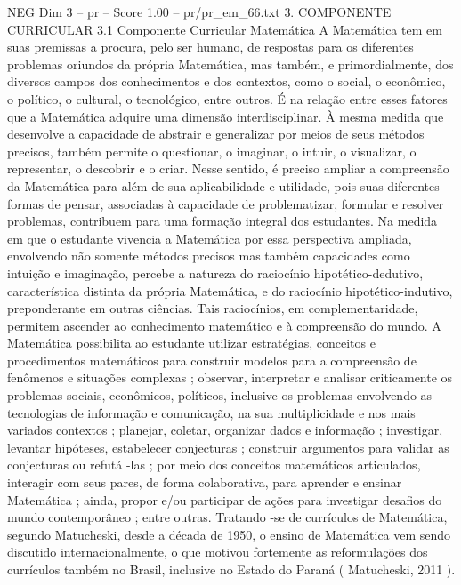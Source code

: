 \begin{textsample}{NEG Dim 3 – pr – Score 1.00 – pr/pr\_em\_66.txt}  \label{ex:f3_neg_140}
3.
COMPONENTE CURRICULAR 3.1 Componente Curricular Matemática A Matemática tem em suas premissas a procura, pelo ser humano, de respostas para os diferentes problemas oriundos da própria Matemática, mas também, e primordialmente, dos diversos campos dos conhecimentos e dos contextos, como o social, o econômico, o político, o cultural, o tecnológico, entre outros.
É na relação entre esses fatores que a Matemática adquire uma dimensão interdisciplinar.
À mesma medida que desenvolve a capacidade de abstrair e generalizar por meios de seus métodos precisos, também permite o questionar, o imaginar, o intuir, o visualizar, o representar, o descobrir e o criar.
Nesse sentido, é preciso ampliar a compreensão da Matemática para além de sua aplicabilidade e utilidade, pois suas diferentes formas de pensar, associadas à capacidade de problematizar, formular e resolver problemas, contribuem para uma formação integral dos estudantes.
Na medida em que o estudante vivencia a Matemática por essa perspectiva ampliada, envolvendo não somente métodos precisos mas também capacidades como intuição e imaginação, percebe a natureza do raciocínio hipotético-dedutivo, característica distinta da própria Matemática, e do raciocínio hipotético-indutivo, preponderante em outras ciências.
Tais raciocínios, em complementaridade, permitem ascender ao conhecimento matemático e à compreensão do mundo.
A Matemática possibilita ao estudante utilizar estratégias, conceitos e procedimentos matemáticos para construir modelos para a compreensão de fenômenos e situações complexas ; observar, interpretar e analisar criticamente os problemas sociais, econômicos, políticos, inclusive os problemas envolvendo as tecnologias de informação e comunicação, na sua multiplicidade e nos mais variados contextos ; planejar, coletar, organizar dados e informação ; investigar, levantar hipóteses, estabelecer conjecturas ; construir argumentos para validar as conjecturas ou refutá -las ; por meio dos conceitos matemáticos articulados, interagir com seus pares, de forma colaborativa, para aprender e ensinar Matemática ; ainda, propor e/ou participar de ações para investigar desafios do mundo contemporâneo ; entre outras.
Tratando -se de currículos de Matemática, segundo Matucheski, desde a década de 1950, o ensino de Matemática vem sendo discutido internacionalmente, o que motivou fortemente as reformulações dos currículos também no Brasil, inclusive no Estado do Paraná ( Matucheski, 2011 ).

\end{textsample}
